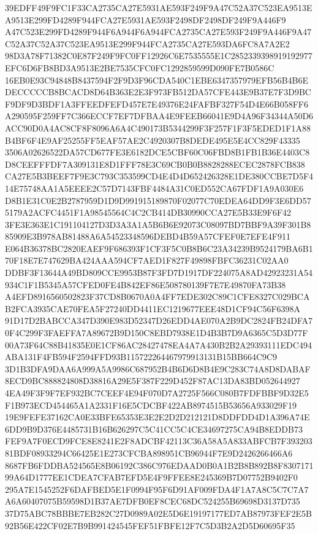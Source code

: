 \documentclass[UTF8,fontset=fandol,zihao=-4,a4paper]{ctexart}
\begin{document}
{{39EDFF49F9FC1F33CA2735CA27E5931AE593F249F9A47C52A37C523EA9513EA9513E299FD4289F944FCA27E5931AE593F2498DF2498DF249F9A446F9
A47C523E299FD4289F944F6A944F6A944FCA2735CA27E593F249F9A446F9A47C52A37C52A37C523EA9513E299F944FCA2735CA27E593DA6FC8A7A2E2
98D3A78F71382C0E87F249F9FC0FF12926C6E7535555E1C2852339398919192977EFC6D6FB8BD3A9513E2BE7535CFC0FC1292859599D090FE7B0586C
16EB0E93C94848B8437594F2F9D3F96CDA540C1EBE6347357979EFB56B4B6EDECCCCCB8BCACD8D64B363E2E3F973FB512DA57CFE443E9B37E7F3D9BC
F9DF9D3BDF1A3FFEEDFEFD457E7E49376E24FAFBF327F54D4E66B058FF6A290595F259FF7C366ECCF7EF7DFBAA4E9FEEB66041E9D4A96F34344A50D6
ACC90D0A4AC8CF8F8096A6A4C490173B5344299F3F257F1F3F5EDED1F1A88B4BF6F4E9AF25255FF5EAF57AE2C4920307B8DEDE495E5E4CC829F43335
3506A02626522DA57CD677FE3E6182DCE5CBF60C06FBD8B1FB1B36E4403C8D8CEEFFFDF7A309131E8D1FFF78E3C69CB0B0B8828288ECEC2878FCB838
CA27E5B3BEEF7F9E3C793C353599CD4E4D4D652426328E1DE380CCBE7D5F414E75748AA1A5EEEE2C57D7143FBF4484A31C0ED552CA67FDF1A9A030E6
D8B1E31C0E2B2787959D1D9D991915189870F02077C70EDEA64DD9F3E6DD575179A2ACFC4451F1A98545564C4C2CB414DB30990CCA27E5B33E9F6F42
3FE3E363E1C191104127D3D3A3A1A5B6B6E92073C08097BD7BBF9A39F301B885909E3B978AB81488A6A54523348596DEBD4B59A57CFEF0E7EFE4F911
E064B36378BC2820EAEF9F686393F1CF3F5C0B8B6C23A34239B9524179BA6B170F18E7E747629BA424AAA594CF7AED1F827F49898FBFC36231C02AA0
DDBF3F13644A49BD809CCE9953B87F3FD7D1917DF224075A8AD42923231A54934C1F1B5345A57CFED0FE4B842EF86E508780139F7E7E49870FA73B38
A4EFD8916560502823F37CD8B0670A0A4FF7EDE302C89C1CFE8327C029BCAB2FCA3935CAE70FEA5F27240DD4411EC1219677EEE48D1CF94C56F6398A
91D17D2BABCCA347D390E983D52347D26EDD4AE070A2B9DC2824FB24DFA70F4C299F3FAEFFA7A89672B9D150C8EBD7938E1D4B3B7D9A6365C5D3D77F
00A73F64C88B41835E0E1CF86AC28427478EA4A7A430B2B2A29393111EDC494ABA131F4FB594F2594FFD93B115722264467979913131B15BB664C9C9
3D1B3DFA9DAA6A999A5A9986C687952B4B6D6D8B4E9C283C74A8D8DABAF8ECD9BC888824808D38816A29E5F387F229D452F87AC13DA83BD052644927
4EA49F3F9F7EF932BC7CEEF4E94F070D7A2725F566C080B7FDFBBF9D32E5F1B973ECD454465A1A2331F16E5CDCBF422AB8974515B53656A933029F19
19E9FEFE37162CA0E33BFE65353E3E2E2D2D212121D8DDFDD4D1A396A74E6DD9B9D376E4485731B16B626297C5C41CC5C4CE34697275CA94B8EDDB73
FEF9A7F0ECD9FCE8E8241E2F8ADCBF42113C36A58A5A833ABFCB7F39320381BDF08933294C66425E1E273CFCBA898951CB96944F7E9D2426266466A6
8687FB6FDDBA524565E8B06192C386C976EDAAD0B0A1B2B8B892B8F830717199A64D1777EE1CDEA7CFAB7EFD5E4F9FFEE8E245369B7D07752B9402F0
295A7E1545252F6DAFBED5E1F0994F95F6D91AF009FDA4F1A7A8C5C7C7A7A6A60407075B59598D1B37AE7DFB0EF8CEC68DC524255B69698D3137D735
37D75ABC78BBBE7EB282C27D0989A02E5D6E19197177ED7AB87973FEF2E5B92B56E422CF02E7B9B991424545FEF51FBFE12F7C5D3B2A2D5D60695F35
}}
\end{document}

